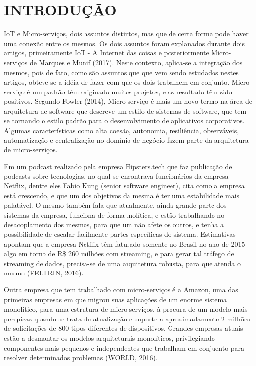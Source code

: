 \section{INTRODUÇÃO}

IoT e Micro-serviços, dois assuntos distintos, mas que de certa forma pode haver uma conexão entre os mesmos. Os dois assuntos foram explanados durante dois artigos, primeiramente IoT - A Internet das coisas e posteriormente Micro-serviços de Marques e Munif (2017). Neste contexto, aplica-se a integração dos mesmos, pois de fato, como são assuntos que que vem sendo estudados nestes artigos, obteve-se a idéia de fazer com que os dois trabalhem em conjunto. Micro-serviço é um padrão têm originado muitos projetos, e os resultado têm sido positivos. Segundo Fowler (2014), Micro-serviço é mais um novo termo na área de arquitetura de software que descreve um estilo de sistemas de software, que tem se tornando o estilo padrão para o desenvolvimento de aplicativos corporativos. Algumas características como alta coesão, autonomia, resiliência, observáveis, automatização e centralização no domínio de negócio fazem parte da arquitetura de micro-serviços. 

Em um podcast realizado pela empresa Hipsters.tech que faz publicação de podcasts sobre tecnologias, no qual se encontrava funcionários da empresa Netflix, dentre eles Fabio Kung (senior software engineer), cita como a empresa está crescendo, e que um dos objetivos da mesma é ter uma estabilidade mais palatável. O mesmo também fala que atualmente, ainda grande parte dos sistemas da empresa, funciona de forma molítica, e estão trabalhando no desacoplamento dos mesmos, para que um não afete os outros, e tenha a possibilidade de escalar facilmente partes específicas do sistema. Estimativas apontam que a empresa Netflix têm faturado somente no Brasil no ano de 2015 algo em torno de R\$ 260 milhões com streaming, e para gerar tal tráfego de streaming de dados, precisa-se de uma arquitetura robusta, para que atenda o mesmo (FELTRIN, 2016).

Outra empresa que tem trabalhado com micro-serviços é a Amazon, uma das primeiras empresas em que migrou suas aplicações de um enorme sistema monolítico, para uma estrutura de micro-serviços, à procura de um modelo mais perspicaz quando se trata de atualização e suporte a aproximadamente 2 milhões de solicitações de 800 tipos diferentes de dispositivos. Grandes empresas atuais estão a desmontar os modelos arquiteturais monolíticos, privilegiando componentes mais pequenos e independentes que trabalham em conjuento para resolver determinados problemas (WORLD, 2016).

